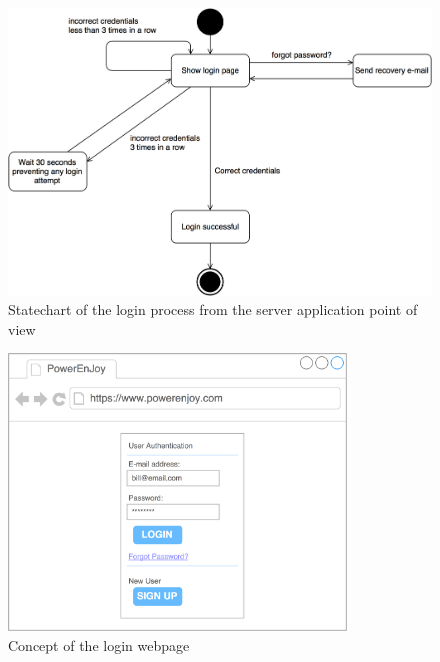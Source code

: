 \begin{figure}[H]
\begin{center}
		\includegraphics[width=\textwidth]{./specific_requirements/features/diagrams/login_statechart.png}
		\caption{Statechart of the login process from the server application point of view}
		\label{login_st}
\end{center}
\end{figure}

\begin{figure}[H]
\begin{center}
		\includegraphics[width=0.8\textwidth]{./specific_requirements/features/diagrams/web_login.png}
		\caption{Concept of the login webpage}
\end{center}
\end{figure}


